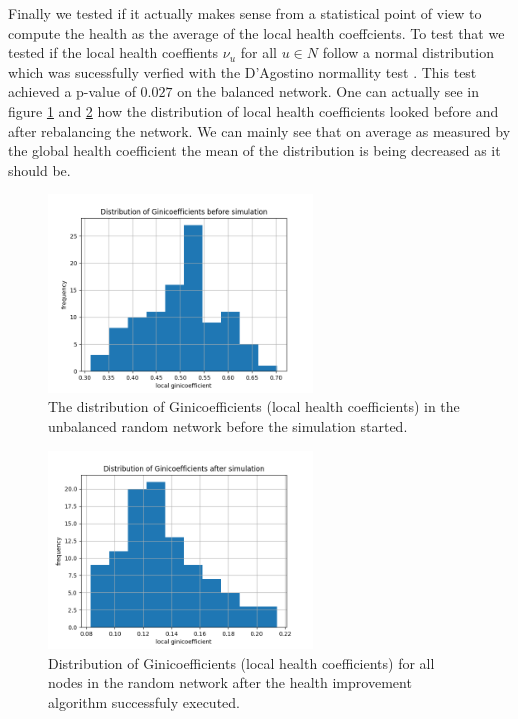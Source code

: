 \documentclass[a4paper]{paper}
\begin{document}
Finally we tested if it actually makes sense from a statistical point of view to compute the health as the average of the local health coeffcients.
To test that we tested if the local health coeffients $\nu_u$ for all $u \in N$ follow a normal distribution which was sucessfully verfied with the D'Agostino normallity test \cite{d1971omnibus}.
This test achieved a p-value of $0.027$ on the balanced network.
One can actually see in figure \ref{fig:giniStart} and \ref{fig:giniEnd} how the distribution of local health coefficients looked before and after rebalancing the network. We can mainly see that on average as measured by the global health coefficient the mean of the distribution is being decreased as it should be.
\begin{figure}
 \centering
 \includegraphics[width=7cm]{code/results/routabilityTest/1574847007_ginicoefficients_start.png}
 \caption{The distribution of Ginicoefficients (local health coefficients) in the unbalanced random network before the simulation started.}
 \label{fig:giniStart}
\end{figure}
\begin{figure}
 \centering
 \includegraphics[width=7cm]{code/results/routabilityTest/1574847007_ginicoefficients_end.png}
 \caption{Distribution of Ginicoefficients (local health coefficients) for all nodes in the random network after the health improvement algorithm successfuly executed.}
 \label{fig:giniEnd}
\end{figure}
\end{document}
